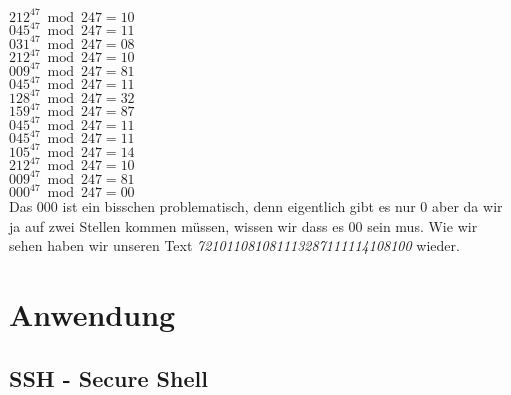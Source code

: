 $ 212^{47} \bmod 247 = 10 $ \\
$ 045^{47} \bmod 247 = 11 $ \\
$ 031^{47} \bmod 247 = 08 $ \\
$ 212^{47} \bmod 247 = 10 $ \\
$ 009^{47} \bmod 247 = 81 $ \\
$ 045^{47} \bmod 247 = 11 $ \\
$ 128^{47} \bmod 247 = 32 $ \\
$ 159^{47} \bmod 247 = 87 $ \\
$ 045^{47} \bmod 247 = 11 $ \\
$ 045^{47} \bmod 247 = 11 $ \\
$ 105^{47} \bmod 247 = 14 $ \\
$ 212^{47} \bmod 247 = 10 $ \\
$ 009^{47} \bmod 247 = 81 $ \\
$ 000^{47} \bmod 247 = 00 $ \\
Das 000 ist ein bisschen problematisch, denn eigentlich gibt es nur 0 aber da wir ja auf zwei Stellen kommen müssen, wissen wir dass es 00 sein mus. Wie wir sehen haben wir unseren Text \textit{721011081081113287111114108100}  wieder.
\section{Anwendung}
\subsection{SSH - Secure Shell}
